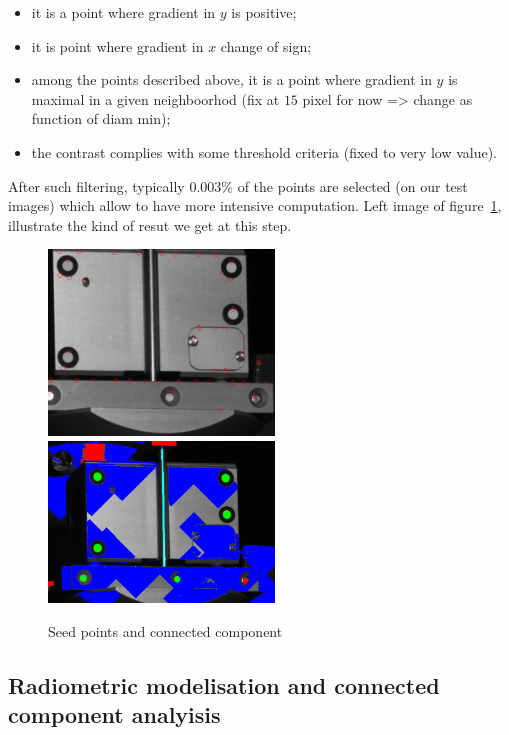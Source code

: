 \begin{itemize}
      \item  it  is a point where gradient in $y$ is positive;
      \item  it  is point where gradient in $x$ change of sign;
      \item  among the points described above, it is a point where gradient in $y$ is maximal
	      in a given neighboorhod (fix at $15$ pixel for now => change as function of diam min);
      \item  the contrast complies with some threshold criteria (fixed to very low value).
\end{itemize}

After such filtering, typically $0.003\%$ of the points are selected (on our test images) which
allow to have more intensive computation.  Left image of figure~\ref{fig:CodeT:Seed}, illustrate
the kind of resut we get at this step.

\begin{figure}
\centering
	\includegraphics[width=6cm]{Methods/Images/Seed.jpg}
	\includegraphics[width=6cm]{Methods/Images/ConnectedComp.jpg}
	\caption{Seed points and connected component}
\label{fig:CodeT:Seed}
\end{figure}


\subsection{Radiometric modelisation and connected component analyisis}

